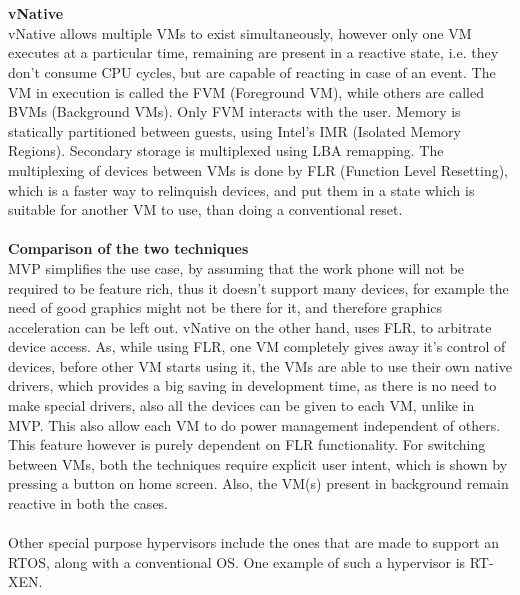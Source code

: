 \documentclass[seminar,twoside]{iitbreport}
\begin{document}
  \\\\
  \textbf{vNative}
  \\
  vNative allows multiple VMs to exist simultaneously, however only one VM executes at a particular time, remaining are present in a reactive state, i.e. they 
  don't consume CPU cycles, but are capable of reacting in case of an event. The VM in execution is called the FVM (Foreground VM), while others are called
  BVMs (Background VMs). Only FVM interacts with the user. Memory is statically partitioned between guests, using Intel's IMR (Isolated Memory Regions). Secondary storage is
  multiplexed using LBA remapping. 
  The multiplexing of devices between VMs is done by FLR (Function Level Resetting), which is a faster way to relinquish devices, and put them in a state which
  is suitable for another VM to use, than doing a conventional reset.
  \\\\
  \textbf{Comparison of the two techniques}
  \\
  MVP simplifies the use case, by assuming that the work phone will not be required to be feature rich, thus it doesn't support many devices, for example the need of 
  good graphics might not be there for it, and therefore graphics acceleration can be left out.
  vNative on the other hand, uses FLR, to arbitrate device access. As, while using FLR, one VM completely gives away it's control of devices, before other
  VM starts using it, the VMs are able to use their own native drivers, which provides a big saving in development time, as there is no need to make special
  drivers, also all the devices can be given to each VM, unlike in MVP. This also allow each VM to do power management independent of others. This feature however is purely dependent on FLR functionality.
  For switching between VMs, both the techniques require explicit user intent, which is shown by pressing a button on home screen. Also, the VM(s) present in 
  background remain reactive in both the cases.
  \\\\
  Other special purpose hypervisors include the ones that are made to support an RTOS, along with a conventional OS. One example of such a hypervisor is RT-XEN\cite{6064510}.
\end{document}
